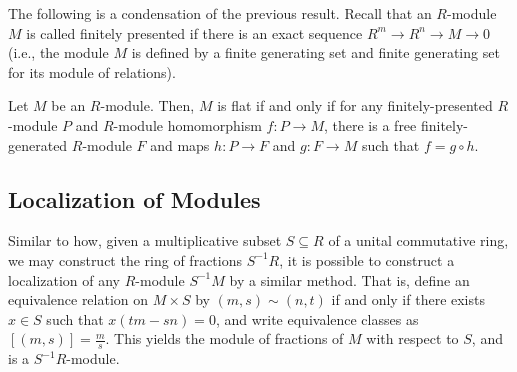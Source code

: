 \documentclass[10pt]{mypackage}
\begin{document}
The following is a condensation of the previous result. Recall that an $R$-module $M$ is called finitely presented if there is an exact sequence $R^{m}\rightarrow R^{n}\rightarrow M\rightarrow 0$ (i.e., the module $M$ is defined by a finite generating set and finite generating set for its module of relations). 
\begin{corollary}
  Let $M$ be an $R$-module. Then, $M$ is flat if and only if for any finitely-presented $R$-module $P$ and $R$-module homomorphism $f\colon P\rightarrow M$, there is a free finitely-generated $R$-module $F$ and maps $h\colon P\rightarrow F$ and $g\colon F\rightarrow M$ such that $f = g\circ h$.
  \begin{center}
  \end{center}
\end{corollary}

\subsection{Localization of Modules}%
Similar to how, given a multiplicative subset $S\subseteq R$ of a unital commutative ring, we may construct the ring of fractions $S^{-1}R$, it is possible to construct a localization of any $R$-module $S^{-1}M$ by a similar method. That is, define an equivalence relation on $M\times S$ by $\left( m,s \right)\sim \left( n,t \right)$ if and only if there exists $x\in S$ such that $x\left( tm-sn \right) = 0$, and write equivalence classes as $\left[ \left( m,s \right) \right] = \frac{m}{s}$. This yields the module of fractions of $M$ with respect to $S$, and is a $S^{-1}R$-module.
\end{document}
